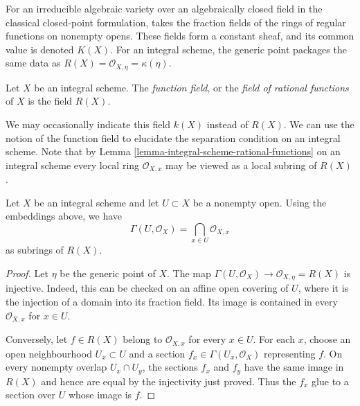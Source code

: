 \begin{definition}
\label{definition-function-field}
\begin{reference}
\cite[Chapter II, \S 1, no. 36, p. 230]{FAC}
\end{reference}
\begin{history}
For an irreducible algebraic variety over an algebraically closed field in
the classical closed-point formulation, \cite{FAC} takes the fraction fields
of the rings of regular functions on nonempty opens. These fields form a
constant sheaf, and its common value is denoted $K(X)$. For an integral scheme,
the generic point packages the same data as
$R(X) = \mathcal{O}_{X, \eta} = \kappa(\eta)$.
\end{history}
Let $X$ be an integral scheme.
The {\it function field}, or the {\it field of rational functions}
of $X$ is the field $R(X)$.
\end{definition}

\noindent
We may occasionally indicate this field $k(X)$ instead of $R(X)$.
We can use the notion of the function field to elucidate the
separation condition on an integral scheme.
Note that by Lemma \ref{lemma-integral-scheme-rational-functions}
on an integral scheme every local ring $\mathcal{O}_{X, x}$ may be viewed
as a local subring of $R(X)$.

\begin{lemma}
\label{lemma-sections-intersection-local-rings}
\begin{reference}
\cite[Chapter II, \S 1, no. 36, p. 230]{FAC}
\end{reference}
Let $X$ be an integral scheme and let $U \subset X$ be a nonempty open.
Using the embeddings above, we have
$$
\Gamma(U, \mathcal{O}_X)
=
\bigcap_{x \in U} \mathcal{O}_{X, x}
$$
as subrings of $R(X)$.
\end{lemma}

\begin{proof}
Let $\eta$ be the generic point of $X$. The map
$\Gamma(U, \mathcal{O}_X) \to \mathcal{O}_{X, \eta} = R(X)$ is injective.
Indeed, this can be checked on an affine open covering of $U$, where it is
the injection of a domain into its fraction field. Its image is contained
in every $\mathcal{O}_{X, x}$ for $x \in U$.

Conversely, let $f \in R(X)$ belong to $\mathcal{O}_{X, x}$ for every
$x \in U$. For each $x$, choose an open neighbourhood $U_x \subset U$
and a section $f_x \in \Gamma(U_x, \mathcal{O}_X)$ representing $f$.
On every nonempty overlap $U_x \cap U_y$, the sections $f_x$ and $f_y$
have the same image in $R(X)$ and hence are equal by the injectivity just
proved. Thus the $f_x$ glue to a section over $U$ whose image is $f$.
\end{proof}

